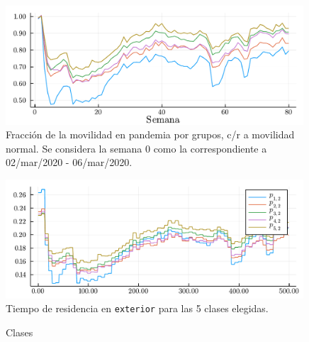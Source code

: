\begin{figure}[!h]
\centering
\includegraphics[width=0.99\textwidth]{img/resultados/mob-reduction.pdf}
\caption[Fracción de la movilidad en pandemia por grupos, c/r a movilidad normal.]{Fracción de la movilidad en pandemia por grupos, c/r a movilidad normal. Se considera la semana 0 como la correspondiente a 02/mar/2020 - 06/mar/2020.}
\label{img:mov-pandemia}
\end{figure}

\begin{figure}[!h]
\centering
\includegraphics[width=0.99\textwidth]{img/resultados/tiempos-exterior.pdf}
\caption[Tiempo de residencia en \texttt{exterior} para las 5 clases elegidas.]{Tiempo de residencia en \texttt{exterior} para las 5 clases elegidas.}
\label{img:Pmatrix-pandemia-exterior}
\end{figure}


\begin{figure}[!h]
\centering

\caption{Clases} \label{fig:clases-legend}
\end{figure}
